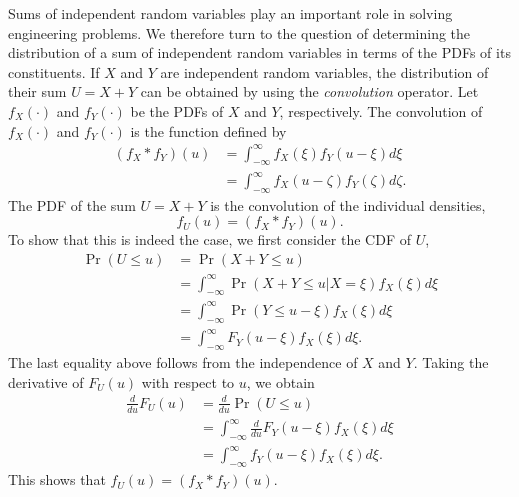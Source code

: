 Sums of independent random variables play an important role in solving engineering problems.
We therefore turn to the question of determining the distribution of a sum of independent random variables in terms of the PDFs of its constituents.
If $X$ and $Y$ are independent random variables, the distribution of their sum $U = X + Y$ can be obtained by using the \emph{convolution} operator. 
Let $f_X (\cdot)$ and $f_Y (\cdot)$ be the PDFs of $X$ and $Y$, respectively.
The convolution of $f_X(\cdot)$ and $f_Y(\cdot)$ is the function defined by
\begin{equation*}
\begin{split}
(f_X \ast f_Y) (u)
&= \int_{-\infty}^{\infty} f_X(\xi) f_Y(u - \xi) d\xi \\
&= \int_{-\infty}^{\infty} f_X(u - \zeta) f_Y(\zeta) d\zeta .
\end{split}
\end{equation*}
The PDF of the sum $U = X + Y$ is the convolution of the individual densities,
\begin{equation*}
f_U (u) = (f_X \ast f_Y) (u) .
\end{equation*}
To show that this is indeed the case, we first consider the CDF of $U$,
\begin{equation*}
\begin{split}
\Pr (U \leq u) &= \Pr (X + Y \leq u) \\
&= \int_{-\infty}^{\infty} \Pr (X + Y \leq u | X = \xi) f_X(\xi) d\xi \\
&= \int_{-\infty}^{\infty} \Pr (Y \leq u - \xi) f_X(\xi) d\xi \\
&= \int_{-\infty}^{\infty} F_Y (u - \xi) f_X(\xi) d\xi .
\end{split}
\end{equation*}
The last equality above follows from the independence of $X$ and $Y$.
Taking the derivative of $F_U (u)$ with respect to $u$, we obtain
\begin{equation*}
\begin{split}
\frac{d}{du} F_U (u) &= \frac{d}{du} \Pr (U \leq u) \\
&= \int_{-\infty}^{\infty} \frac{d}{du} F_Y (u - \xi) f_X(\xi) d\xi \\
&= \int_{-\infty}^{\infty} f_Y (u - \xi) f_X(\xi) d\xi .
\end{split}
\end{equation*}
This shows that $f_U(u) = (f_X \ast f_Y) (u)$.

